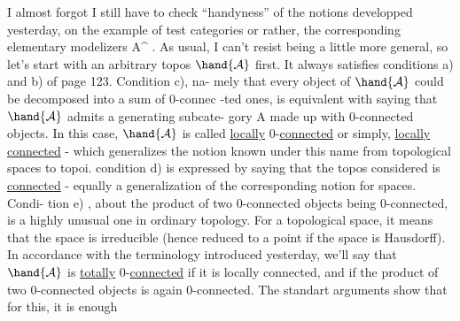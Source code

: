   I almost forgot I still have to check ``handyness'' of the notions
developped yesterday,  on the example of test categories or rather,  the
corresponding elementary modelizers A\^{} .  As usual,  I can't resist being
a little more general,  so let's start with an arbitrary topos $\hand{\mathcal{A}}$ first.
It always satisfies conditions a) and b) of page 123.  Condition c),  na-%
mely that every object of $\hand{\mathcal{A}}$ could be decomposed into a sum of 0-connec%
-ted ones,  is equivalent with saying that $\hand{\mathcal{A}}$ admits a generating subcate-%
gory  A \unsure{\hand{$\circ$}}made up with 0-connected objects.  In this case, $\hand{\mathcal{A}}$ is called
\uline{locally} 0-\uline{connected} or simply,  \uline{locally connected}  -  which generalizes
the notion known under this name from topological spaces to topoi.  
condition d) is expressed by saying that the topos considered is \uline{connected}
- equally a generalization of the corresponding notion for spaces.  Condi-%
tion e) ,  about the product of two 0-connected objects
being 0-connected,  is a highly unusual one in ordinary topology.  For a
topological space,  it means that the space is irreducible (hence reduced
to a point if the space is Hausdorff).  In accordance with the terminology
introduced yesterday,  we'll say that $\hand{\mathcal{A}}$ is \uline{totally} 0-\uline{connected} if it is
locally connected,  and if the product of two 0-connected objects is again
0-connected.  The standart arguments show that for this,  it is enough

